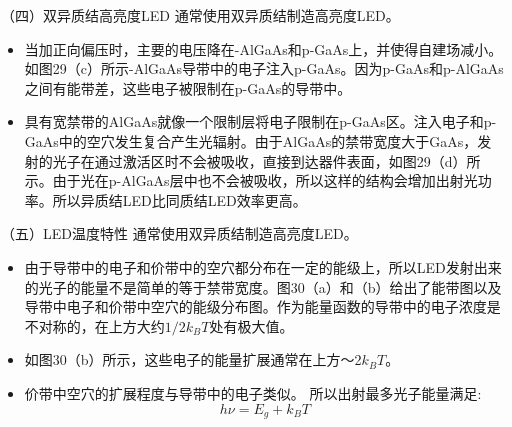 \documentclass[trans]{beamer} %
\begin{document}
 \begin{frame}{（四）双异质结高亮度LED}
  通常使用双异质结制造高亮度LED。
    \begin{itemize}
        \item 当加正向偏压时，主要的电压降在-AlGaAs和p-GaAs上，并使得自建场减小。如图29（c）所示-AlGaAs导带中的电子注入p-GaAs。因为p-GaAs和p-AlGaAs之间有能带差，这些电子被限制在p-GaAs的导带中。 
        \item 具有宽禁带的AlGaAs就像一个限制层将电子限制在p-GaAs区。注入电子和p-GaAs中的空穴发生复合产生光辐射。由于AlGaAs的禁带宽度大于GaAs，发射的光子在通过激活区时不会被吸收，直接到达器件表面，如图29（d）所示。由于光在p-AlGaAs层中也不会被吸收，所以这样的结构会增加出射光功率。所以异质结LED比同质结LED效率更高。
    \end{itemize}
 \end{frame} 
 
 
 \begin{frame}{（五）LED温度特性}
  通常使用双异质结制造高亮度LED。
    \begin{itemize}
        \item 由于导带中的电子和价带中的空穴都分布在一定的能级上，所以LED发射出来的光子的能量不是简单的等于禁带宽度。图30（a）和（b）给出了能带图以及导带中电子和价带中空穴的能级分布图。作为能量函数的导带中的电子浓度是不对称的，在上方大约$1/2k_BT$处有极大值。
        \item 如图30（b）所示，这些电子的能量扩展通常在上方～2$k_BT$。
        \item 价带中空穴的扩展程度与导带中的电子类似。
所以出射最多光子能量满足:
$$h\nu=E_g+k_BT$$
    \end{itemize}
 \end{frame} 
 
\end{document}
